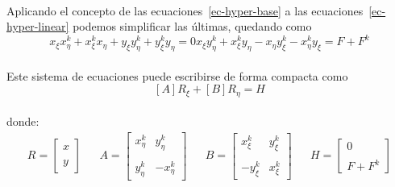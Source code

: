 \documentclass[letterpaper, openright, 12pt]{book}
\begin{document}
    \paragraph*{}
        Aplicando el concepto de las ecuaciones~\ref{ec-hyper-base} a las
        ecuaciones~\ref{ec-hyper-linear} podemos simplificar las últimas,
        quedando como
        \begin{subequations}
            \begin{equation}
                x_{\xi} x_{\eta}^{k} + x_{\xi}^{k} x_{\eta} + y_{\xi} y_{\eta}^{k} + y_{\xi}^{k} y_{\eta} = 0
            \end{equation}
            \begin{equation}
                x_{\xi} y_{\eta}^{k} + x_{\xi}^{k} y_{\eta} - x_{\eta} y_{\xi}^{k} - x_{\eta}^{k} y_{\xi} = F + F^{k}
            \end{equation}
            \label{ec-hyper-reducida}
        \end{subequations}
    \paragraph*{}
        Este sistema de ecuaciones puede escribirse de forma compacta como
        \begin{equation}
            \left[A \right] R_{\xi} + \left[ B \right] R_{\eta} = H
            \label{ec-hyper-compacta}
        \end{equation}\\ 
        donde:
        \begin{align*}
            R = \begin{bmatrix}
            x \\ \\
            y
            \end{bmatrix}&&
            A = \begin{bmatrix}
            x_{\eta}^{k} & y_{\eta}^{k} \\ \\
            y_{\eta}^{k} & -x_{\eta}^{k}
            \end{bmatrix}&&
            B = \begin{bmatrix}
            x_{\xi}^{k} & y_{\xi}^{k} \\ \\
            -y_{\xi}^{k} & x_{\xi}^{k}
            \end{bmatrix}&&
            H = \begin{bmatrix}
            0 \\ \\
            F + F^{k}
            \end{bmatrix}
        \end{align*}
\end{document}
